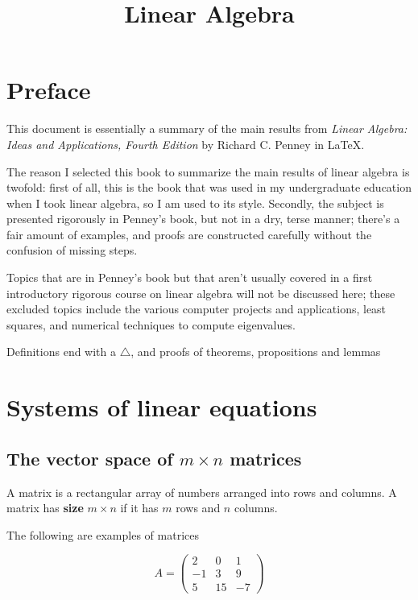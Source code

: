 \documentclass[12pt,a4paper,oneside]{book}
\title{Linear Algebra}
\author{}
\theoremstyle{definition}
\theoremstyle{plain}
\begin{document}
\maketitle
\tableofcontents

\chapter*{Preface}

This document is essentially a summary of the main results from \emph{Linear Algebra: Ideas and Applications, Fourth Edition} by Richard C. Penney in \LaTeX.

The reason I selected this book to summarize the main results of linear algebra is twofold: first of all, this is the book that was used in my undergraduate education when I took linear algebra, so I am used to its style. Secondly, the subject is presented rigorously in Penney's book, but not in a dry, terse manner; there's a fair amount of examples, and proofs are constructed carefully without the confusion of missing steps.

Topics that are in Penney's book but that aren't usually covered in a first introductory rigorous course on linear algebra will not be discussed here; these excluded topics include the various computer projects and applications, least squares, and numerical techniques to compute eigenvalues.

Definitions end with a $\triangle$, and proofs of theorems, propositions and lemmas 
\chapter{Systems of linear equations}

\section{The vector space of $m\times n$ matrices}
A matrix is a rectangular array of numbers arranged into rows and columns. A matrix has \textbf{size} $m\times n$ if it has $m$ rows and $n$ columns.

The following are examples of matrices 

\begin{equation*}
A = \begin{pmatrix} 2 & 0 & 1 \\ -1 & 3 & 9 \\ 5 & 15 & -7\end{pmatrix}
\end{equation*}
\end{document}
